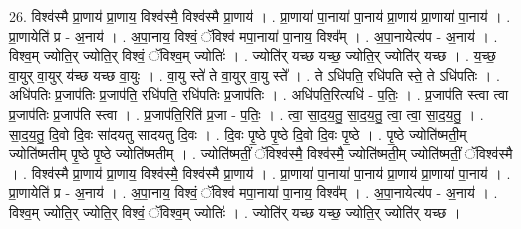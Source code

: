 \documentclass[17pt]{extarticle}
\begin{document}
26. विश्व॑स्मै प्रा॒णाय॑ प्रा॒णाय॒ विश्व॑स्मै॒ विश्व॑स्मै प्रा॒णाय॑ । . प्रा॒णाया॑ पा॒नाया॑ पा॒नाय॑ प्रा॒णाय॑ प्रा॒णाया॑ पा॒नाय॑ । . प्रा॒णायेति॑ प्र - अ॒नाय॑ । . अ॒पा॒नाय॒ विश्वं॒ ॅविश्व॑ मपा॒नाया॑ पा॒नाय॒ विश्व᳚म् । . अ॒पा॒नायेत्य॑प - अ॒नाय॑ । . विश्व॒म् ज्योति॒र् ज्योति॒र् विश्वं॒ ॅविश्व॒म् ज्योतिः॑ । . ज्योति॑र् यच्छ यच्छ॒ ज्योति॒र् ज्योति॑र् यच्छ । . य॒च्छ॒ वा॒युर् वा॒युर् य॑च्छ यच्छ वा॒युः । . वा॒यु स्ते॑ ते वा॒युर् वा॒यु स्ते᳚ । . ते ऽधि॑पति॒ रधि॑पति स्ते॒ ते ऽधि॑पतिः । . अधि॑पतिः प्र॒जाप॑तिः प्र॒जाप॑ति॒ रधि॑पति॒ रधि॑पतिः प्र॒जाप॑तिः । . अधि॑पति॒रित्यधि॑ - प॒तिः॒ । . प्र॒जाप॑ति स्त्वा त्वा प्र॒जाप॑तिः प्र॒जाप॑ति स्त्वा । . प्र॒जाप॑ति॒रिति॑ प्र॒जा - प॒तिः॒ । . त्वा॒ सा॒द॒य॒तु॒ सा॒द॒य॒तु॒ त्वा॒ त्वा॒ सा॒द॒य॒तु॒ । . सा॒द॒य॒तु॒ दि॒वो दि॒वः सा॑दयतु सादयतु दि॒वः । . दि॒वः पृ॒ष्ठे पृ॒ष्ठे दि॒वो दि॒वः पृ॒ष्ठे । . पृ॒ष्ठे ज्योति॑ष्मती॒म् ज्योति॑ष्मतीम् पृ॒ष्ठे पृ॒ष्ठे ज्योति॑ष्मतीम् । . ज्योति॑ष्मतीं॒ ॅविश्व॑स्मै॒ विश्व॑स्मै॒ ज्योति॑ष्मती॒म् ज्योति॑ष्मतीं॒ ॅविश्व॑स्मै । . विश्व॑स्मै प्रा॒णाय॑ प्रा॒णाय॒ विश्व॑स्मै॒ विश्व॑स्मै प्रा॒णाय॑ । . प्रा॒णाया॑ पा॒नाया॑ पा॒नाय॑ प्रा॒णाय॑ प्रा॒णाया॑ पा॒नाय॑ । . प्रा॒णायेति॑ प्र - अ॒नाय॑ । . अ॒पा॒नाय॒ विश्वं॒ ॅविश्व॑ मपा॒नाया॑ पा॒नाय॒ विश्व᳚म् । . अ॒पा॒नायेत्य॑प - अ॒नाय॑ । . विश्व॒म् ज्योति॒र् ज्योति॒र् विश्वं॒ ॅविश्व॒म् ज्योतिः॑ । . ज्योति॑र् यच्छ यच्छ॒ ज्योति॒र् ज्योति॑र् यच्छ । \newline
\end{document}
